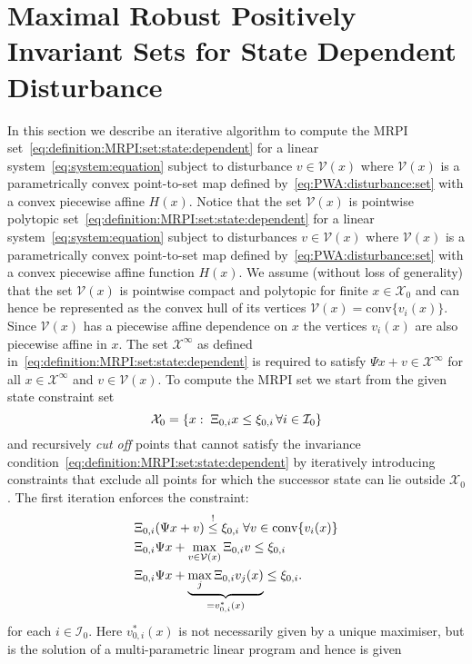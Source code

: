 \documentclass[letterpaper, 10pt, conference]{ieeeconf} %
\providecommand{\conv}{\text{conv}}
\begin{document}
\section{Maximal Robust Positively Invariant Sets for State Dependent Disturbance}\label{sec:state:dep:MRPI}
In this section we describe an iterative algorithm to compute the MRPI set~\eqref{eq:definition:MRPI:set:state:dependent} 
for a linear system~\eqref{eq:system:equation} subject to disturbance
$v\in\mathcal V(x)$ where $\mathcal V(x)$ is a parametrically convex point-to-set map defined 
by~\eqref{eq:PWA:disturbance:set} with a convex piecewise affine $H(x)$.
Notice that the set $\mathcal V(x)$ is pointwise polytopic set~\eqref{eq:definition:MRPI:set:state:dependent} 
for a linear system~\eqref{eq:system:equation} subject to disturbances
$v\in\mathcal V(x)$ where $\mathcal V(x)$ is a parametrically convex point-to-set map defined 
by~\eqref{eq:PWA:disturbance:set} with a convex piecewise affine function $H(x)$.
We assume (without loss of generality) that the set $\mathcal V(x)$ is pointwise compact and polytopic 
for finite $x\in\mathcal X_0$ and can hence be represented as the 
convex hull of its vertices $\mathcal V(x) = \conv\{v_i(x)\}$. Since ${\mathcal{V}}(x)$
has a piecewise affine dependence on $x$ the vertices $v_i(x)$ are also piecewise affine in $x$.
The set $\mathcal X^\infty$ as defined in~\eqref{eq:definition:MRPI:set:state:dependent} 
is required to satisfy $\Psi x + v\in\mathcal X^\infty$ for all
$x\in\mathcal X^\infty$ and $v\in\mathcal V(x)$. To compute the MRPI set we start from the given 
state constraint set
\[
\mathcal X_0 = \{x:\;\Xi_{0,i}x\leq \xi_{0,i}\,\forall i\in\mathcal I_0\}
\]
and
recursively \emph{cut off} points that cannot satisfy the invariance condition~\eqref{eq:definition:MRPI:set:state:dependent}
by iteratively introducing constraints that exclude all points for which the successor state can lie outside 
$\mathcal X_0$. The first iteration enforces the constraint:
%
\[
\begin{split}
	&\genmat_{0,i}(\Psi x + v)\overset{!}{\leq}\genvec_{0,i}\;\forall v\in\conv\{v_i(x)\}\\
	&\genmat_{0,i}\Psi x + \max_{v\in\mathcal V(x)} \genmat_{0,i} v \leq \genvec_{0,i}\\
	&\genmat_{0,i}\Psi x + \underbrace{\max_{j} \genmat_{0,i} v_j(x)}_{=v_{0,i}^\ast(x)} \leq \genvec_{0,i}.
\end{split}
\]
%
for each $i\in \mathcal I_0$.
Here $v_{0,i}^\ast(x)$ is not necessarily given by a unique maximiser, 
but is the solution of a multi-parametric linear program and hence is given 
\end{document}
